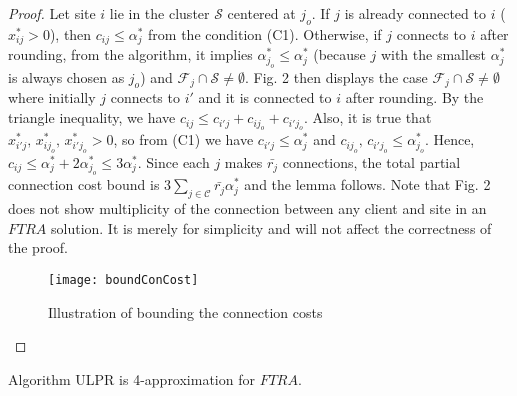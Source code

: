 \documentclass[10pt]{llncs}
\begin{document}
\begin{proof}
Let site $i$ lie in the cluster $\mathcal{S}$ centered at $j_{o}$.
If $j$ is already connected to $i$ ($x_{ij}^{*}>0$), then $c_{ij}\leq\alpha_{j}^{*}$
from the condition (C1). Otherwise, if $j$ connects to $i$ after
rounding, from the algorithm, it implies $\alpha_{j_{o}}^{*}\leq\alpha_{j}^{*}$
(because $j$ with the smallest $\alpha_{j}^{*}$ is always chosen
as $j_{o}$) and $\mathcal{F}_{j}\cap\mathcal{S}\neq\emptyset$. Fig.
2 then displays the case $\mathcal{F}_{j}\cap\mathcal{S}\neq\emptyset$
where initially $j$ connects to $i'$ and it is connected to $i$
after rounding. By the triangle inequality, we have $c_{ij}\leq c_{i'j}+c_{ij_{o}}+c_{i'j_{o}}$.
Also, it is true that $x_{i'j}^{*},\, x_{ij_{o}}^{*},\, x_{i'j_{o}}^{*}>0$,
so from (C1) we have $c_{i'j}\leq\alpha_{j}^{*}$ and $ $$c_{ij_{o}},\, c_{i'j_{o}}\leq\alpha_{j_{o}}^{*}$.
Hence, $c_{ij}\leq\alpha_{j}^{*}+2\alpha_{j_{o}}^{*}\leq3\alpha_{j}^{*}$.
Since each $j$ makes $\bar{r_{j}}$ connections, the total partial
connection cost bound is $3\sum_{j\in\mathcal{C}}\bar{r_{j}}\alpha_{j}^{*}$
and the lemma follows. Note that Fig. 2 does not show multiplicity
of the connection between any client and site in an $FTRA$ solution.
It is merely for simplicity and will not affect the correctness of
the proof.
\begin{figure}
\begin{centering}
\texttt{[image: boundConCost]}
\par\end{centering}

\caption{Illustration of bounding the connection costs}
\end{figure}
\end{proof}
\begin{theorem}
Algorithm ULPR is 4-approximation for $FTRA$.\end{theorem}
\end{document}
